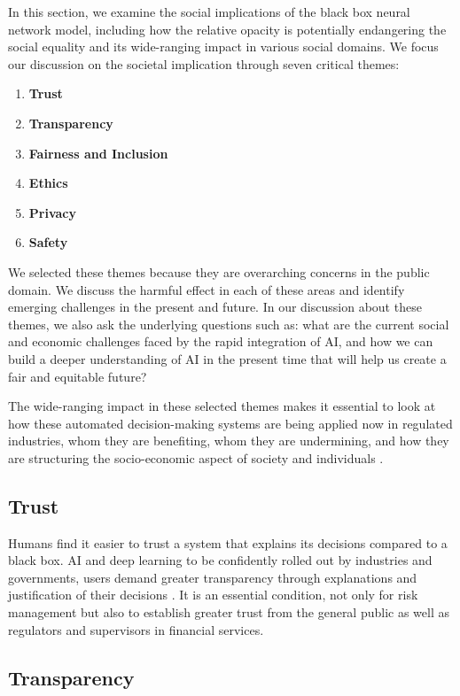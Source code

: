In this section, we examine the social implications of the black box neural network model, including how the relative opacity is potentially endangering the social equality and its wide-ranging impact in various social domains. We focus our discussion on the societal implication through seven critical themes:

\begin{enumerate}
\item \textbf{Trust}
\item  \textbf{Transparency}
\item \textbf{Fairness and Inclusion}
\item \textbf{Ethics}
\item \textbf{Privacy}
\item \textbf{Safety}
\end{enumerate}

We selected these themes because they are overarching concerns in the public domain. We discuss the harmful effect in each of these areas and identify emerging challenges in the present and future. In our discussion about these themes, we also ask the underlying questions such as: what are the current social and economic challenges faced by the rapid integration of AI, and how we can build a deeper understanding of AI in the present time that will help us create a fair and equitable future? \cite{Solon2017}

The wide-ranging impact in these selected themes makes it essential to look at how these automated decision-making systems are being applied now in regulated industries, whom they are benefiting, whom they are undermining, and how they are structuring the socio-economic aspect of society and individuals \cite{ainow2016report}.

\subsection{Trust}

Humans find it easier to trust a system that explains its decisions compared to a black box. AI and deep learning to be confidently rolled out by industries and governments, users demand greater transparency through explanations and justification of their decisions \cite{molnar}. It is an essential condition, not only for risk management but also to establish greater trust from the general public as well as regulators and supervisors in financial services.


\subsection{Transparency}

